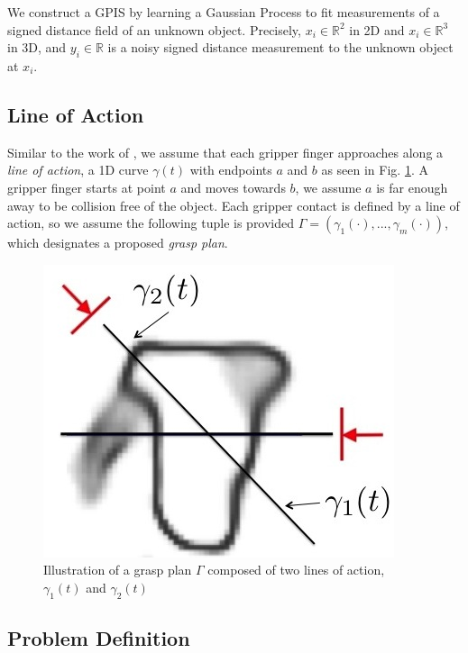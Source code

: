 \documentclass[letterpaper, 10 pt, conference]{ieeeconf}  %
\begin{document}
We construct a GPIS by learning a Gaussian Process to fit measurements of a signed distance field of an unknown object.  Precisely, $x_i \in \mathbb{R}^2$ in 2D and $x_i \in \mathbb{R}^3$ in 3D, and $y_i \in \mathbb{R}$ is a noisy signed distance measurement to the unknown object at $x_i$.



\subsection{Line of Action}
Similar to the work of \cite{christopoulos2007handling}, we assume that each gripper finger approaches along a \textit{line of action}, a 1D curve $\gamma(t)$ with endpoints $a$ and $b$ as seen in Fig. \ref{fig:line_of_action}. A gripper finger starts at point $a$ and moves towards $b$, we assume $a$ is far enough away to be collision free of the object.  Each gripper contact is defined by a line of action, so we assume the following tuple is provided $\Gamma = ( \gamma_1(\cdot),...,\gamma_m(\cdot) )$, which designates a proposed \textit{grasp plan}. 

\begin{figure}[ht!]
\centering
\includegraphics[scale = 0.3]{figures/Slide01.jpg}
\caption{Illustration of a grasp plan $\Gamma$ composed of two lines of action, $\gamma_1(t)$ and $\gamma_2(t)$}
\vspace*{-10pt}
\label{fig:line_of_action}
\end{figure}

\subsection{Problem Definition}
\end{document}
